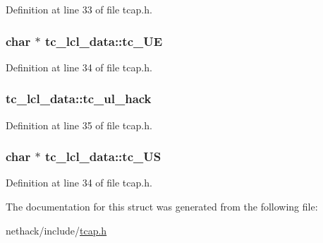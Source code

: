 Definition at line 33 of file tcap.\+h.

\hypertarget{structtc__lcl__data_afad6682077dc6d6c82fa0b8d9b53f832}{
\subsubsection[{tc\+\_\+\+U\+E}]{\setlength{\rightskip}{0pt plus 5cm}char $\ast$ tc\+\_\+lcl\+\_\+data\+::tc\+\_\+\+U\+E}}\label{structtc__lcl__data_afad6682077dc6d6c82fa0b8d9b53f832}


Definition at line 34 of file tcap.\+h.

\hypertarget{structtc__lcl__data_aee5d807cd6b3ac43b7b9e91c5cda0006}{
\subsubsection[{tc\+\_\+ul\+\_\+hack}]{ tc\+\_\+lcl\+\_\+data\+::tc\+\_\+ul\+\_\+hack}}\label{structtc__lcl__data_aee5d807cd6b3ac43b7b9e91c5cda0006}


Definition at line 35 of file tcap.\+h.

\hypertarget{structtc__lcl__data_ac6d0dda0e3860679a976ef5054585cf8}{
\subsubsection[{tc\+\_\+\+U\+S}]{\setlength{\rightskip}{0pt plus 5cm}char $\ast$ tc\+\_\+lcl\+\_\+data\+::tc\+\_\+\+U\+S}}\label{structtc__lcl__data_ac6d0dda0e3860679a976ef5054585cf8}


Definition at line 34 of file tcap.\+h.



The documentation for this struct was generated from the following file\+:\begin{DoxyCompactItemize}
\item 
nethack/include/\hyperlink{tcap_8h}{tcap.\+h}\end{DoxyCompactItemize}
